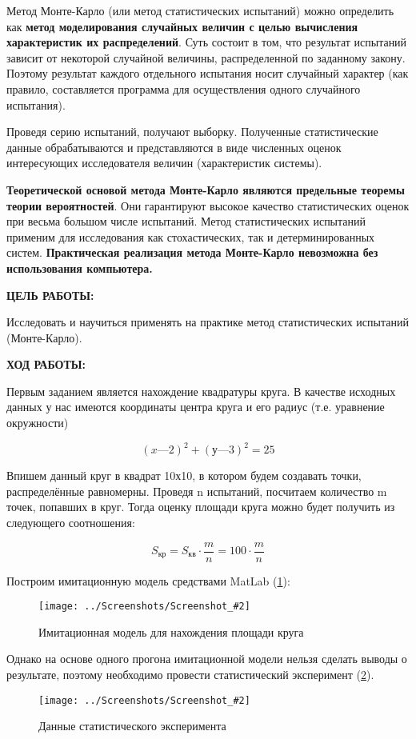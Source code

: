 \documentclass[14pt,a4paper]{extreport}
\newcommand{\screenshot}[2]{\begin{figure}[ht]%
\centering\texttt{[image: ../Screenshots/Screenshot\_\#2]}%
\caption{#1}%
\label{picture#2}%
\end{figure}%
}
\newcommand{\header}[1]{%
{
\clearpage%
\fontsize{16pt}{14pt}\selectfont
\begin{center}
\textbf{\MakeUppercase{#1}:}
\end{center}
}
}
\begin{document}
Метод Монте-Карло (или метод статистических испытаний) можно
определить как \textbf{метод моделирования случайных величин с целью
вычисления характеристик их распределений}. Суть состоит в том, что
результат испытаний зависит от некоторой случайной величины, распределенной по заданному закону. Поэтому результат каждого отдельного испытания носит случайный характер (как правило, составляется программа для осуществления одного случайного испытания). \par
Проведя серию испытаний, получают выборку. Полученные статистические данные обрабатываются и представляются в виде численных оценок интересующих исследователя величин (характеристик системы). \par\textbf{Теоретической основой метода Монте-Карло являются предельные
теоремы теории вероятностей}. Они гарантируют высокое качество статистических оценок при весьма большом числе испытаний. Метод статистических испытаний применим для исследования как стохастических, так и детерминированных систем. \textbf{Практическая реализация метода Монте-Карло невозможна без использования компьютера.}

\header{Цель работы}

Исследовать и научиться применять на практике метод статистических испытаний (Монте-Карло).

\header{Ход работы}

Первым заданием является нахождение квадратуры круга. В качестве исходных данных у нас имеются координаты центра круга и его радиус (т.е. уравнение окружности)

$$
	(x—2)^2  + (у—3)^2 = 25
$$

Впишем данный круг в квадрат 10х10, в котором будем создавать точки, распределённые равномерны. Проведя n испытаний, посчитаем количество m точек, попавших в круг. Тогда оценку площади круга можно будет получить из следующего соотношения:

$$
	S_{кр} = S_{кв} \cdot \frac{m}{n} = 100 \cdot \frac{m}{n}
$$


Построим имитационную модель средствами MatLab (\ref{picture1}):

\screenshot{Имитационная модель для нахождения площади круга}{1}

\par

Однако на основе одного прогона имитационной модели нельзя сделать выводы о результате, поэтому необходимо провести статистический эксперимент (\ref{picture2}).

\screenshot{Данные статистического эксперимента}{2}
\end{document}
